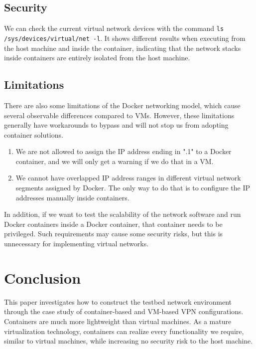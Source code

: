\documentclass[article]{aaltoseries}
\begin{document}
\subsection{Security}
We can check the current virtual network devices with the command \texttt{ls /sys/devices/virtual/net -l}. It shows different results when executing from the host machine and inside the container, indicating that the network stacks inside containers are entirely isolated from the host machine.

\subsection{Limitations}

There are also some limitations of the Docker networking model, which cause several observable differences compared to VMs. However, these limitations generally have workarounds to bypass and will not stop us from adopting container solutions.

\begin{enumerate}
\setlength{\itemsep}{0pt}
\setlength{\parsep}{0pt}
\setlength{\parskip}{0pt}
\item We are not allowed to assign the IP address ending in ".1" to a Docker container, and we will only get a warning if we do that in a VM.
\item We cannot have overlapped IP address ranges in different virtual network segments assigned by Docker. The only way to do that is to configure the IP addresses manually inside containers.
\end{enumerate}

In addition, if we want to test the scalability of the network software and run Docker containers inside a Docker container, that container needs to be privileged. Such requirements may cause some security risks, but this is unnecessary for implementing virtual networks.



\section{Conclusion}

This paper investigates how to construct the testbed network environment through the case study of container-based and VM-based VPN configurations. Containers are much more lightweight than virtual machines. As a mature virtualization technology, containers can realize every functionality we require, similar to virtual machines, while increasing no security risk to the host machine.
\end{document}
